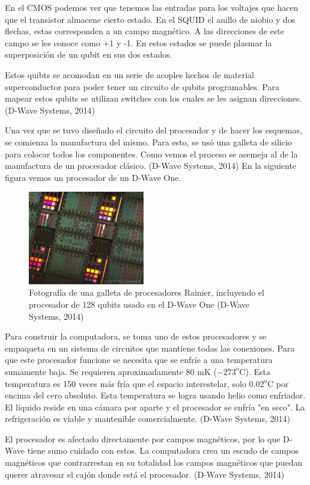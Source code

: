 \documentclass[11pt,a4paper]{article}
\begin{document}
En el CMOS podemos ver que tenemos las entradas para los voltajes que hacen que el transistor almacene cierto estado. En el SQUID el anillo de niobio y dos flechas, estas corresponden a un campo magnético. A las direcciones de este campo se les conoce como +1 y -1. En estos estados se puede plasmar la superposición de un qubit en sus dos estados.

Estos quibts se acomodan en un serie de acoples hechos de material superconductor para poder tener un circuito de qubits programables. Para mapear estos qubits se utilizan switches con los cuales se les asignan direcciones. (D-Wave Systems, 2014)

Una vez que se tuvo diseñado el circuito del procesador y de hacer los esquemas, se comienza la manufactura del mismo. Para esto, se usó una galleta de silicio para colocar todos los componentes. Como vemos el proceso se asemeja al de la manufactura de un procesador clásico. (D-Wave Systems, 2014) En la siguiente figura vemos un procesador de un D-Wave One.
\clearpage
\begin{figure}
\centering
\includegraphics[width=0.45\textwidth]{proce}
\caption{Fotografía de una galleta de procesadores Rainier, incluyendo el procesador de 128 qubits usado en el D-Wave One (D-Wave Systems, 2014)}
\end{figure}

Para construir la computadora, se toma uno de estos procesadores y se empaqueta en un sistema de circuitos que mantiene todas las conexiones. Para que este procesador funcione se necesita que se enfríe a una temperatura sumamente baja. Se requieren aproximadamente 80 mK ($-273^o$C). Esta temperatura es 150 veces más fría que el espacio interestelar, solo $0.02^o$C por encima del cero absoluto. Esta temperatura se logra usando helio como enfriador. El líquido reside en una cámara por aparte y el procesador se enfría "en seco". La refrigeración es viable y mantenible comercialmente. (D-Wave Systems, 2014)

El procesador es afectado directamente por campos magnéticos, por lo que D-Wave tiene sumo cuidado con estos. La computadora crea un escudo de campos magnéticos que contrarrestan en su totalidad los campos magnéticos que puedan querer atravesar el cajón donde está el procesador. (D-Wave Systems, 2014)
\end{document}
